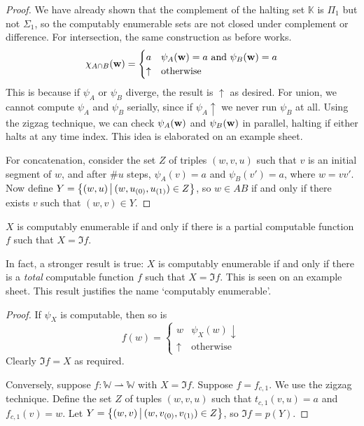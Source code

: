 \begin{proof}
	We have already shown that the complement of the halting set \( \mathbb K \) is \( \Pi_1 \) but not \( \Sigma_1 \), so the computably enumerable sets are not closed under complement or difference.
	For intersection, the same construction as before works.
	\[ \chi_{A \cap B}(\vb w) = \begin{cases}
		a & \psi_A(\vb w) = a \text{ and } \psi_B(\vb w) = a \\
		\uparrow & \text{otherwise}
	\end{cases} \]
	This is because if \( \psi_A \) or \( \psi_B \) diverge, the result is \( \uparrow \) as desired.
	For union, we cannot compute \( \psi_A \) and \( \psi_B \) serially, since if \( \psi_A \uparrow \) we never run \( \psi_B \) at all.
	Using the zigzag technique, we can check \( \psi_A(\vb w) \) and \( \psi_B(\vb w) \) in parallel, halting if either halts at any time index.
	This idea is elaborated on an example sheet.

	For concatenation, consider the set \( Z \) of triples \( (w, v, u) \) such that \( v \) is an initial segment of \( w \), and after \( \#u \) steps, \( \psi_A(v) = a \) and \( \psi_B(v') = a \), where \( w = vv' \).
	Now define \( Y = \qty{(w, u) \,\middle|\,(w, u_{(0)}, u_{(1)}) \in Z} \), so \( w \in AB \) if and only if there exists \( v \) such that \( (w, v) \in Y \).
\end{proof}
\begin{proposition}
	\( X \) is computably enumerable if and only if there is a partial computable function \( f \) such that \( X = \Im f \).
\end{proposition}
\begin{remark}
	In fact, a stronger result is true: \( X \) is computably enumerable if and only if there is a \emph{total} computable function \( f \) such that \( X = \Im f \).
	This is seen on an example sheet.
	This result justifies the name `computably enumerable'.
\end{remark}
\begin{proof}
	If \( \psi_X \) is computable, then so is
	\[ f(w) = \begin{cases}
		w & \psi_X(w) \downarrow \\
		\uparrow & \text{otherwise}
	\end{cases} \]
	Clearly \( \Im f = X \) as required.

	Conversely, suppose \( f \colon \mathbb W \rightharpoonup \mathbb W \) with \( X = \Im f \).
	Suppose \( f = f_{c,1} \).
	We use the zigzag technique.
	Define the set \( Z \) of tuples \( (w, v, u) \) such that \( t_{c,1}(v,u) = a \) and \( f_{c,1}(v) = w \).
	Let \( Y = \qty{(w,v) \,\middle|\,(w, v_{(0)}, v_{(1)}) \in Z} \), so \( \Im f = p(Y) \).
\end{proof}

